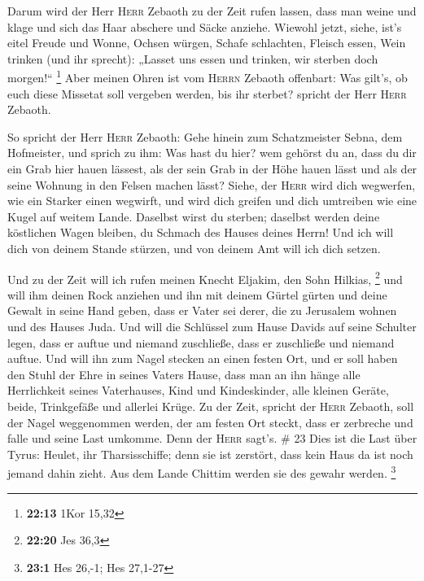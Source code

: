  Darum wird der Herr \textsc{Herr} Zebaoth zu der Zeit
rufen lassen, dass man weine und klage und sich das Haar abschere und
Säcke anziehe.  Wiewohl jetzt, siehe, ist's eitel Freude
und Wonne, Ochsen würgen, Schafe schlachten, Fleisch essen, Wein trinken
(und ihr sprecht): „Lasset uns essen und trinken, wir sterben doch
morgen!{}`` \footnote{\textbf{22:13} 1Kor 15,32}  Aber
meinen Ohren ist vom \textsc{Herrn} Zebaoth offenbart: Was gilt's, ob
euch diese Missetat soll vergeben werden, bis ihr sterbet? spricht der
Herr \textsc{Herr} Zebaoth.

 So spricht der Herr \textsc{Herr} Zebaoth: Gehe hinein
zum Schatzmeister Sebna, dem Hofmeister, und sprich zu ihm:
 Was hast du hier? wem gehörst du an, dass du dir ein
Grab hier hauen lässest, als der sein Grab in der Höhe hauen lässt und
als der seine Wohnung in den Felsen machen lässt?  Siehe,
der \textsc{Herr} wird dich wegwerfen, wie ein Starker einen wegwirft,
und wird dich greifen  und dich umtreiben wie eine Kugel
auf weitem Lande. Daselbst wirst du sterben; daselbst werden deine
köstlichen Wagen bleiben, du Schmach des Hauses deines Herrn!
 Und ich will dich von deinem Stande stürzen, und von
deinem Amt will ich dich setzen.

 Und zu der Zeit will ich rufen meinen Knecht Eljakim,
den Sohn Hilkias, \footnote{\textbf{22:20} Jes 36,3}  und
will ihm deinen Rock anziehen und ihn mit deinem Gürtel gürten und deine
Gewalt in seine Hand geben, dass er Vater sei derer, die zu Jerusalem
wohnen und des Hauses Juda.  Und will die Schlüssel zum
Hause Davids auf seine Schulter legen, dass er auftue und niemand
zuschließe, dass er zuschließe und niemand auftue.  Und
will ihn zum Nagel stecken an einen festen Ort, und er soll haben den
Stuhl der Ehre in seines Vaters Hause,  dass man an ihn
hänge alle Herrlichkeit seines Vaterhauses, Kind und Kindeskinder, alle
kleinen Geräte, beide, Trinkgefäße und allerlei Krüge. 
Zu der Zeit, spricht der \textsc{Herr} Zebaoth, soll der Nagel
weggenommen werden, der am festen Ort steckt, dass er zerbreche und
falle und seine Last umkomme. Denn der \textsc{Herr} sagt's. \# 23
 Dies ist die Last über Tyrus: Heulet, ihr Tharsisschiffe;
denn sie ist zerstört, dass kein Haus da ist noch jemand dahin zieht.
Aus dem Lande Chittim werden sie des gewahr werden. \footnote{\textbf{23:1}
  Hes 26,-1; Hes 27,1-27}

